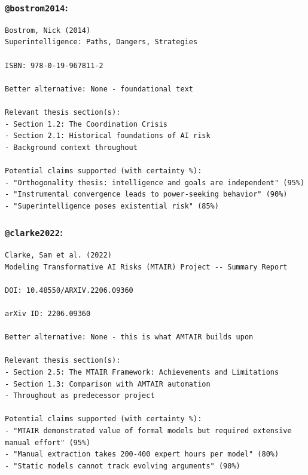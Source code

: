 \documentclass[
  11pt,
  letterpaper,
]{book}
\begin{document}
\subsubsection*{\texorpdfstring{\texttt{@bostrom2014}:
\textcite{bostrom2014}}{@bostrom2014: @bostrom2014}}\label{bostrom2014-bostrom2014}

\begin{verbatim}
Bostrom, Nick (2014)
Superintelligence: Paths, Dangers, Strategies

ISBN: 978-0-19-967811-2

Better alternative: None - foundational text

Relevant thesis section(s):
- Section 1.2: The Coordination Crisis
- Section 2.1: Historical foundations of AI risk
- Background context throughout

Potential claims supported (with certainty %):
- "Orthogonality thesis: intelligence and goals are independent" (95%)
- "Instrumental convergence leads to power-seeking behavior" (90%)
- "Superintelligence poses existential risk" (85%)
\end{verbatim}

\subsubsection*{\texorpdfstring{\texttt{@clarke2022}:
\textcite{clarke2022}}{@clarke2022: @clarke2022}}\label{clarke2022-clarke2022}

\begin{verbatim}
Clarke, Sam et al. (2022)
Modeling Transformative AI Risks (MTAIR) Project -- Summary Report

DOI: 10.48550/ARXIV.2206.09360

arXiv ID: 2206.09360

Better alternative: None - this is what AMTAIR builds upon

Relevant thesis section(s):
- Section 2.5: The MTAIR Framework: Achievements and Limitations
- Section 1.3: Comparison with AMTAIR automation
- Throughout as predecessor project

Potential claims supported (with certainty %):
- "MTAIR demonstrated value of formal models but required extensive manual effort" (95%)
- "Manual extraction takes 200-400 expert hours per model" (80%)
- "Static models cannot track evolving arguments" (90%)
\end{verbatim}
\end{document}
